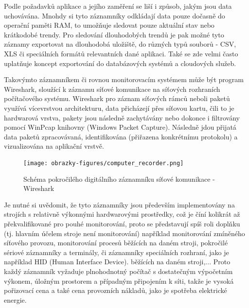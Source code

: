 % 
Podle požadavků aplikace a jejího zaměření se liší i způsob, jakým jsou data uchovávána. Mnohdy si tyto záznamníky odkládají data pouze dočasně do operační paměti RAM, to umožňuje sledovat pouze aktuální stav nebo krátkodobé trendy. Pro sledování dlouhodobých trendů je pak možné tyto záznamy exportovat na dlouhodobá uložiště, do různých typů souborů - CSV, XLS či speciálních formátů relevantních dané aplikaci. Také se zde velmi často uplatňuje koncept exportování do databázových systémů a cloudových služeb.

Takovýmto záznamníkem či rovnou monitorovacím systémem může být program Wireshark, sloužící k záznamu síťové komunikace na síťových rozhraních počítačového systému. Wireshark pro záznam síťových rámců neboli paketů využívá vícevrstvou architekturu, data přicházejí přes síťovou kartu, čili to je hardwarová vrstva, pakety jsou následně zachytávány nebo dokonce i filtrovány pomocí WinPcap knihovny (Windows Packet Capture). Následně jdou přijatá data paketů zpracovávaná, identifikována (přiřazena konkrétnímu protokolu) a vizualizována na aplikační vrstvě. \cite{researchgate_wireshark_architecture, wireshark_architecture_diagram}

\begin{figure}[h]
    \centering
    \texttt{[image: obrazky-figures/computer\_recorder.png]}
    
    \caption{Schéma pokročilého digitálního záznamníku síťové komunikace - Wireshark \cite{researchgate_wireshark_architecture, winpcap_architecture}}
    \label{fig:computer-recorder}
\end{figure}

Je nutné si uvědomit, že tyto záznamníky jsou především implementovány na strojích s relativně výkonnými hardwarovými prostředky, což je číní kolikrát až překvalifikované pro pouhé monitorování, proto se představují spíš roli doplňku (tj. hlavním účelem stroje není monitorování) například monitorování zmíněného síťového provozu, monitorování procesů běžících na daném stroji, pokročilé sériové záznamníky a terminály, či záznamníky speciálních rozhraní, jako je například HID (Human Interface Device). běžících na daném stroji,... Proto každý záznamník vyžaduje plnohodnotný počítač s dostatečným výpočetním výkonem, úložným prostorem a případným připojením k síti, takže je vysoká pořizovací cena a také cena provozních nákladů, jako je spotřeba elektrické energie.  

